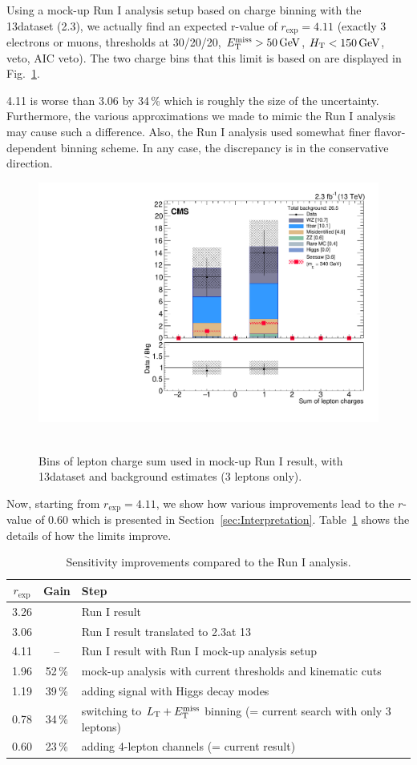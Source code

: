 Using a mock-up Run I analysis setup based on charge binning with the 13\TeV dataset (2.3\fbinv), we actually find an expected r-value of $r_\textrm{exp} = 4.11$ (exactly 3 electrons or muons, \pt thresholds at 30/20/20\GeV, $E_{\mathrm{T}}^{\text{miss}} > 50\,\text{Ge\hspace{-.08em}V}$, $H_{\mathrm{T}} < 150\,\text{Ge\hspace{-.08em}V}$, \Z veto, AIC veto). The two charge bins that this limit is based on are displayed in Fig.~\ref{fig:app:RunI}.

4.11 is worse than 3.06 by 34\,\% which is roughly the size of the uncertainty. Furthermore, the various approximations we made to mimic the Run I analysis may cause such a difference. Also, the Run I analysis used somewhat finer flavor-dependent binning scheme. In any case, the discrepancy is in the conservative direction.

\begin{figure}
\begin{center}
	\includegraphics[width=.7\textwidth]{Results/L3Tau0_Q}\
	\caption{Bins of lepton charge sum used in mock-up Run I result, with 13\TeV dataset and background estimates (3 leptons only).
	\label{fig:app:RunI}}
\end{center}
\end{figure}

Now, starting from $r_\textrm{exp} = 4.11$, we show how various improvements lead to the $r$-value of 0.60 which is presented in Section~\ref{sec:Interpretation}. Table~\ref{tab:improvements} shows the details of how the limits improve.

\begin{table}[h]
\centering
\caption{Sensitivity improvements compared to the Run I analysis.} \label{tab:improvements}
\begin{tabular}{c c l}
\hline\hline
$r_\textrm{exp}$ & Gain & Step \\
\hline
\hline
3.26 & & Run I result \\
3.06 & & Run I result translated to 2.3\fbinv at 13\TeV\\
\hline
4.11 & -- & Run I result with Run I mock-up analysis setup \\
1.96 & 52\,\% & mock-up analysis with current \pt thresholds and kinematic cuts \\
1.19 & 39\,\% & adding signal with Higgs decay modes \\
0.78 & 34\,\% & switching to $L_\textrm{T} + E_{\mathrm{T}}^{\text{miss}}$ binning (= current search with only 3 leptons) \\
0.60 & 23\,\% & adding 4-lepton channels (= current result) \\
\end{tabular}
\end{table}
